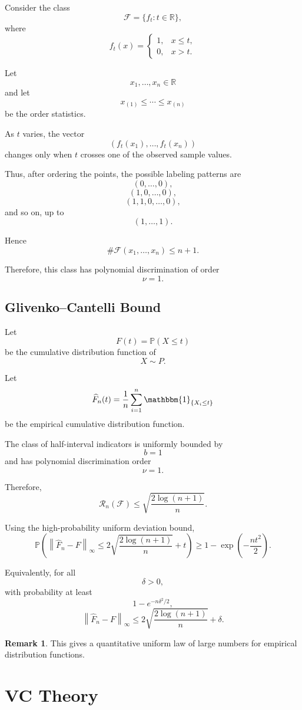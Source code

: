 \documentclass[12pt,oneside]{book}
\numberwithin{equation}{section}
\theoremstyle{definition}
\newtheorem{remark}{Remark}[section]
\theoremstyle{plain}
\theoremstyle{remark}
\newcommand{\R}{\mathbb{R}}
\newcommand{\Prob}{\mathbb{P}}
\newcommand{\ind}{\mathbbm{1}}
\newcommand{\norm}[1]{\left\lVert #1 \right\rVert}
\begin{document}
Consider the class
\[
\mathcal{F}
=
\{f_t:t\in\R\},
\]
where
\[
f_t(x)
=
\begin{cases}
1, & x\leq t,\\
0, & x>t.
\end{cases}
\]

Let
\[
x_1,\dots,x_n\in\R
\]
and let
\[
x_{(1)}\leq \cdots \leq x_{(n)}
\]
be the order statistics.

As $t$ varies, the vector
\[
(f_t(x_1),\dots,f_t(x_n))
\]
changes only when $t$ crosses one of the observed sample values.

Thus, after ordering the points, the possible labeling patterns are
\[
(0,\dots,0),
\]
\[
(1,0,\dots,0),
\]
\[
(1,1,0,\dots,0),
\]
and so on, up to
\[
(1,\dots,1).
\]

Hence
\[
\#\mathcal{F}(x_1,\dots,x_n)
\leq
n+1.
\]

Therefore, this class has polynomial discrimination of order
\[
\nu=1.
\]

\section{Glivenko--Cantelli Bound}

Let
\[
F(t)=\Prob(X\leq t)
\]
be the cumulative distribution function of
\[
X\sim P.
\]

Let
\[
\widehat{F}_n(t)
=
\frac{1}{n}
\sum_{i=1}^n
\ind_{\{X_i\leq t\}}
\]
be the empirical cumulative distribution function.

The class of half-interval indicators is uniformly bounded by
\[
b=1
\]
and has polynomial discrimination order
\[
\nu=1.
\]

Therefore,
\[
\mathcal{R}_n(\mathcal{F})
\leq
\sqrt{
\frac{2\log(n+1)}{n}
}.
\]

Using the high-probability uniform deviation bound,
\[
\Prob\left(
\norm{\widehat{F}_n-F}_{\infty}
\leq
2\sqrt{
\frac{2\log(n+1)}{n}
}
+t
\right)
\geq
1-\exp\left(
-\frac{nt^2}{2}
\right).
\]

Equivalently, for all
\[
\delta>0,
\]
with probability at least
\[
1-e^{-n\delta^2/2},
\]
\[
\norm{\widehat{F}_n-F}_{\infty}
\leq
2\sqrt{
\frac{2\log(n+1)}{n}
}
+
\delta.
\]

\begin{remark}
This gives a quantitative uniform law of large numbers for empirical distribution functions.
\end{remark}

\chapter{VC Theory}
\end{document}
